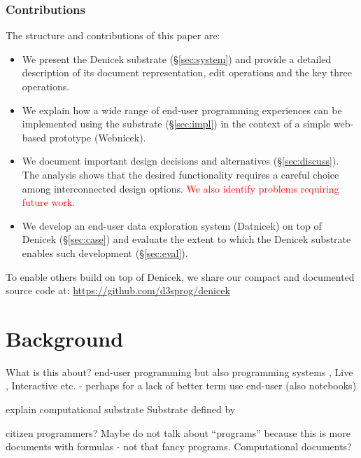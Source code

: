 \documentclass[sigconf,anonymous,screen]{acmart}
\newcommand{\note}[1]{\textcolor{red}{#1}}
\begin{document}
\subsubsection*{Contributions}
The structure and contributions of this paper are:

\begin{itemize}
\item We present the Denicek substrate (\S\ref{sec:system}) and provide a detailed description of its
  document representation, edit operations and the key three operations.
\item We explain how a wide range of end-user programming experiences can be implemented using
  the substrate (\S\ref{sec:impl}) in the context of a simple web-based prototype (Webnicek).
\item We document important design decisions and alternatives (\S\ref{sec:discuss}). The analysis
  shows that the desired functionality requires a careful choice among interconnected design options.
  \note{We also identify problems requiring future work.}
\item We develop an end-user data exploration system (Datnicek) on top of Denicek (\S\ref{sec:case})
  and evaluate the extent to which the Denicek substrate enables such development (\S\ref{sec:eval}).
\end{itemize}

\noindent
To enable others build on top of Denicek, we share our compact and documented
source code at: \url{https://github.com/d3sprog/denicek}


\section{Background}
\label{sec:background}

What is this about? end-user programming \cite{myers-2006-eup}
but also programming systems \cite{jakubovic-2023-techdims},
Live \cite{rein-2019-live}, Interactive etc. - perhaps for a lack of better term use end-user
(also notebooks)

explain computational substrate
Substrate defined by \cite{jakubovic-2022-ladder}

citizen programmers? Maybe do not talk about ``programs'' because this is more documents with
formulas - not that fancy programs. Computational documents?
\end{document}
